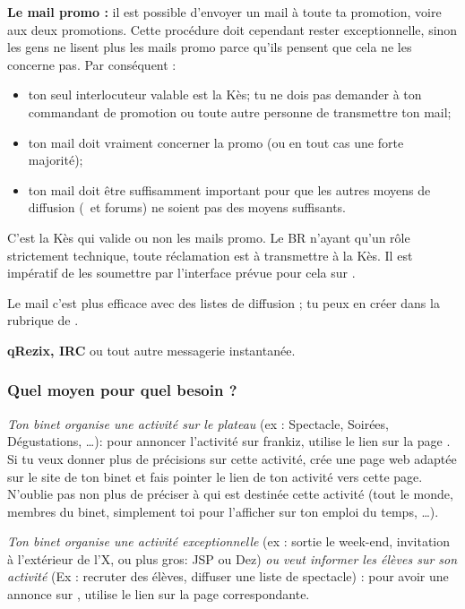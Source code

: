 \textbf{Le mail promo :} il est possible d'envoyer un mail à toute
ta promotion, voire aux deux promotions. Cette procédure doit
cependant rester exceptionnelle, sinon les gens ne lisent plus les
mails promo parce qu'ils pensent que cela ne les concerne pas. Par
conséquent :
\begin{itemize}
  \item ton seul interlocuteur valable est la Kès; tu ne dois pas demander à ton commandant de promotion
        ou toute autre personne de transmettre ton mail;
  \item ton mail doit vraiment concerner la promo (ou en tout cas une forte majorité);
  \item ton mail doit être suffisamment important pour que les autres moyens de diffusion (\fkz\ et forums) ne soient pas des moyens suffisants.
\end{itemize}
C'est la Kès qui valide ou non les mails promo. Le BR n'ayant qu'un rôle strictement technique, toute réclamation est à transmettre à la Kès. Il est
impératif de les soumettre par l'interface prévue pour cela sur \fkz.

  Le mail c'est plus efficace avec des listes de diffusion ; tu peux en créer dans la rubrique  de .

\textbf{qRezix, IRC} ou tout autre messagerie instantanée.

\subsubsection{Quel moyen pour quel besoin ?}
\emph{Ton binet organise une activité sur le plateau} (ex : Spectacle,
Soirées, Dégustations, \dots): pour annoncer l'activité sur frankiz, utilise
le lien  sur la page . Si tu veux donner plus de
précisions sur cette activité, crée une page web adaptée sur le site
de ton binet et fais pointer le lien de ton activité vers cette
page. N'oublie pas non plus de pr\'eciser \`a qui est destin\'ee cette activit\'e (tout le monde, membres du binet, simplement toi pour l'afficher sur ton emploi du temps, \dots).

\emph{Ton binet organise une activité exceptionnelle} (ex : sortie le week-end, invitation à l'extérieur de l'X, ou plus gros: JSP ou Dez) 
\emph{ou veut informer les élèves sur son activité} (Ex : recruter des élèves, diffuser une liste de spectacle) : pour avoir une annonce sur \fkz, utilise le lien  sur la page correspondante.


